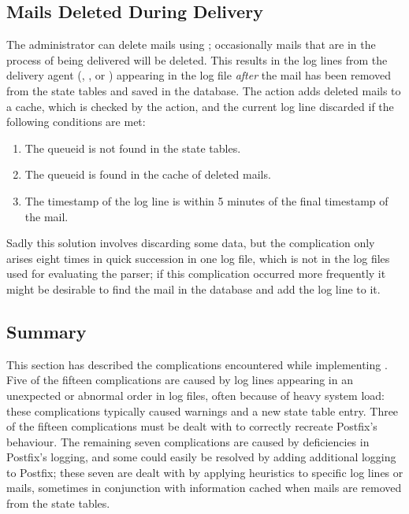 \subsection{Mails Deleted During Delivery}

\label{Mails deleted during delivery}

The administrator can delete mails using ; occasionally
mails that are in the process of being delivered will be deleted.  This
results in the log lines from the delivery agent (,
, or ) appearing in the log file
\textit{after\/} the mail has been removed from the state tables and saved
in the database.  The  action adds deleted mails to a cache,
which is checked by the  action, and the current log
line discarded if the following conditions are met:

\begin{enumerate}

    \item The queueid is not found in the state tables.

    \item The queueid is found in the cache of deleted mails.

    \item The timestamp of the log line is within 5 minutes of the final
        timestamp of the mail.

\end{enumerate}

Sadly this solution involves discarding some data, but the complication
only arises eight times in quick succession in one log file, which is not
in the \numberOFlogFILES{} log files used for evaluating the parser; if
this complication occurred more frequently it might be desirable to find
the mail in the database and add the log line to it.

\subsection{Summary}

This section has described the complications encountered while implementing
\parsername{}.  Five of the fifteen complications are caused by log lines
appearing in an unexpected or abnormal order in log files, often because of
heavy system load: these complications typically caused warnings and a new
state table entry.  Three of the fifteen complications must be dealt with
to correctly recreate Postfix's behaviour.  The remaining seven
complications are caused by deficiencies in Postfix's logging, and some
could easily be resolved by adding additional logging to Postfix; these
seven are dealt with by applying heuristics to specific log lines or mails,
sometimes in conjunction with information cached when mails are removed
from the state tables.
